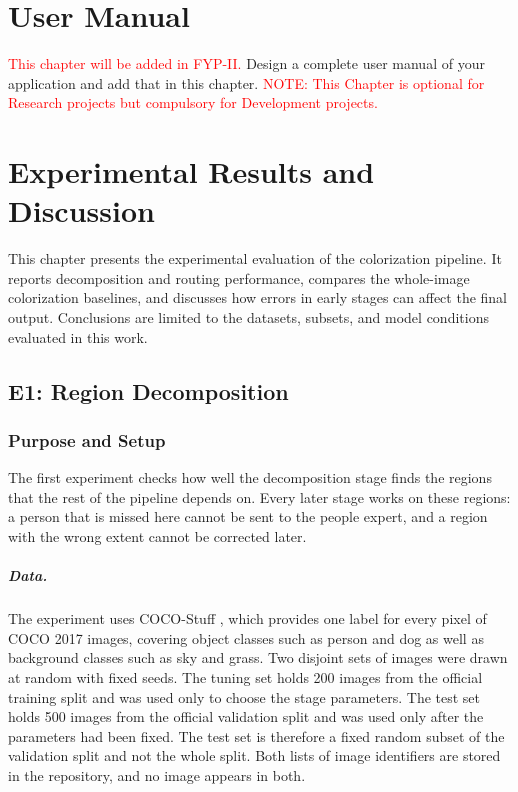 \documentclass{FastFyp}
\begin{document}
\chapter{User Manual}
\label{ch:user-manual}
\textcolor{red}{This chapter will be added in FYP-II.} Design a complete user manual of your application and add that in this chapter.
\textcolor{red}{NOTE: This Chapter is optional for Research projects but compulsory for Development projects.}

\chapter{Experimental Results and Discussion}
\label{ch:results}
This chapter presents the experimental evaluation of the colorization
pipeline. It reports decomposition and routing performance, compares the
whole-image colorization baselines, and discusses how errors in early stages
can affect the final output. Conclusions are limited to the datasets,
subsets, and model conditions evaluated in this work.

\section{E1: Region Decomposition}

\subsection{Purpose and Setup}
The first experiment checks how well the decomposition stage finds the regions that the rest of the pipeline depends on. Every later stage works on these regions: a person that is missed here cannot be sent to the people expert, and a region with the wrong extent cannot be corrected later.
 
\paragraph{Data.} The experiment uses COCO-Stuff \cite{caesar2018cocostuff}, which provides one label for every pixel of COCO 2017 images, covering object classes such as person and dog as well as background classes such as sky and grass. Two disjoint sets of images were drawn at random with fixed seeds. The tuning set holds 200 images from the official training split and was used only to choose the stage parameters. The test set holds 500 images from the official validation split and was used only after the parameters had been fixed. The test set is therefore a fixed random subset of the validation split and not the whole split. Both lists of image identifiers are stored in the repository, and no image appears in both.
 
\end{document}
